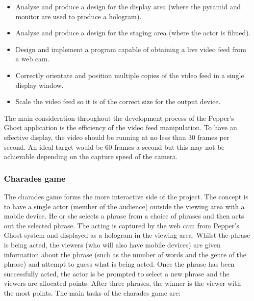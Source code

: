 \begin{itemize}
	\item Analyse and produce a design for the display area (where the pyramid and monitor are used to produce a hologram).
	
	\item Analyse and produce a design for the staging area (where the actor is filmed).
	
	\item Design and implement a program capable of obtaining a live video feed from a web cam.
	
	\item Correctly orientate and position multiple copies of the video feed in a single display window.

	\item Scale the video feed so it is of the correct size for the output device.

\end{itemize}

The main consideration throughout the development process of the Pepper's Ghost application is the efficiency of the video feed manipulation. To have an effective display, the video should be running at no less than 30 frames per second. An ideal target would be 60 frames a second but this may not be achievable depending on the capture speed of the camera.
 
\subsubsection{Charades game}
The charades game forms the more interactive side of the project. The concept is to have a single actor (member of the audience) outside the viewing area with a mobile device. He or she selects a phrase from a choice of phrases and then acts out the selected phrase. The acting is captured by the web cam from Pepper's Ghost system and displayed as a hologram in the viewing area. Whilst the phrase is being acted, the viewers (who will also have mobile devices) are given information about the phrase (such as the number of words and the genre of the phrase) and attempt to guess what is being acted. Once the phrase has been successfully acted, the actor is be prompted to select a new phrase and the viewers are allocated points. After three phrases, the winner is the viewer with the most points. The main tasks of the charades game are:


